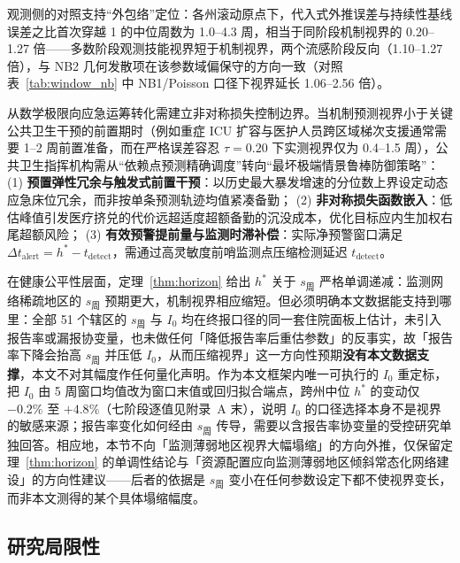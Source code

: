 \documentclass[10pt,UTF8,a4paper,zihao=-4]{ctexart}
\theoremstyle{plain}
\theoremstyle{remark}
\begin{document}
\begin{table}[htbp]
\centering
\footnotesize
\caption{四档容忍阈值下的机制视界跨州中位数（周，5 周基准窗口，$\tau=0.50$ 口径与表~\ref{tab:horizons} 一致）}
\label{tab:tau_tiers}
\setlength{\tabcolsep}{5pt}

\end{table}

观测侧的对照支持“外包络”定位：各州滚动原点下，代入式外推误差与持续性基线误差之比首次穿越 1 的中位周数为 1.0--4.3 周，相当于同阶段机制视界的 0.20--1.27 倍——多数阶段观测技能视界短于机制视界，两个流感阶段反向（1.10--1.27 倍），与 NB2 几何发散项在该参数域偏保守的方向一致（对照表~\ref{tab:window_nb} 中 NB1/Poisson 口径下视界延长 1.06--2.56 倍）。

从数学极限向应急运筹转化需建立非对称损失控制边界\citep{parag2025asymmetric}。当机制预测视界小于关键公共卫生干预的前置期时（例如重症 ICU 扩容与医护人员跨区域梯次支援通常需要 1--2 周前置准备，而在严格误差容忍 $\tau = 0.20$ 下实测视界仅为 0.4--1.5 周），公共卫生指挥机构需从“依赖点预测精确调度”转向“最坏极端情景鲁棒防御策略”：
(1) \textbf{预置弹性冗余与触发式前置干预}：以历史最大暴发增速的分位数上界设定动态应急床位冗余，而非按单条预测轨迹均值紧凑备勤；
(2) \textbf{非对称损失函数嵌入}：低估峰值引发医疗挤兑的代价远超适度超额备勤的沉没成本，优化目标应内生加权右尾超额风险；
(3) \textbf{有效预警提前量与监测时滞补偿}：实际净预警窗口满足 $\Delta t_{\text{alert}} = h^* - t_{\text{detect}}$，需通过高灵敏度前哨监测点压缩检测延迟 $t_{\text{detect}}$。

在健康公平性层面，定理~\ref{thm:horizon} 给出 $h^*$ 关于 $s_{\text{周}}$ 严格单调递减：监测网络稀疏地区的 $s_{\text{周}}$ 预期更大，机制视界相应缩短。但必须明确本文数据能支持到哪里：全部 51 个辖区的 $s_{\text{周}}$ 与 $I_0$ 均在终报口径的同一套住院面板上估计，未引入报告率或漏报协变量，也未做任何「降低报告率后重估参数」的反事实，故「报告率下降会抬高 $s_{\text{周}}$ 并压低 $I_0$，从而压缩视界」这一方向性预期\textbf{没有本文数据支撑}，本文不对其幅度作任何量化声明。作为本文框架内唯一可执行的 $I_0$ 重定标，把 $I_0$ 由 5 周窗口均值改为窗口末值或回归拟合端点，跨州中位 $h^*$ 的变动仅 $-0.2\%$ 至 $+4.8\%$（七阶段逐值见附录~A 末），说明 $I_0$ 的口径选择本身不是视界的敏感来源；报告率变化如何经由 $s_{\text{周}}$ 传导，需要以含报告率协变量的受控研究单独回答。相应地，本节不向「监测薄弱地区视界大幅塌缩」的方向外推，仅保留定理~\ref{thm:horizon} 的单调性结论与「资源配置应向监测薄弱地区倾斜常态化网络建设」的方向性建议——后者的依据是 $s_{\text{周}}$ 变小在任何参数设定下都不使视界变长，而非本文测得的某个具体塌缩幅度。

\subsection{研究局限性}\label{sec:limitations}
\end{document}
